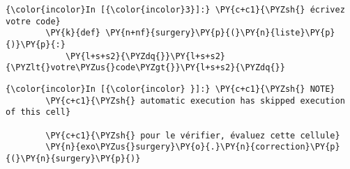     \begin{Verbatim}[commandchars=\\\{\}]
{\color{incolor}In [{\color{incolor}3}]:} \PY{c+c1}{\PYZsh{} écrivez votre code}
        \PY{k}{def} \PY{n+nf}{surgery}\PY{p}{(}\PY{n}{liste}\PY{p}{)}\PY{p}{:}
            \PY{l+s+s2}{\PYZdq{}}\PY{l+s+s2}{\PYZlt{}votre\PYZus{}code\PYZgt{}}\PY{l+s+s2}{\PYZdq{}}
\end{Verbatim}


    \begin{Verbatim}[commandchars=\\\{\}]
{\color{incolor}In [{\color{incolor} }]:} \PY{c+c1}{\PYZsh{} NOTE}
        \PY{c+c1}{\PYZsh{} automatic execution has skipped execution of this cell}
        
        \PY{c+c1}{\PYZsh{} pour le vérifier, évaluez cette cellule}
        \PY{n}{exo\PYZus{}surgery}\PY{o}{.}\PY{n}{correction}\PY{p}{(}\PY{n}{surgery}\PY{p}{)}
\end{Verbatim}



    
    
    
